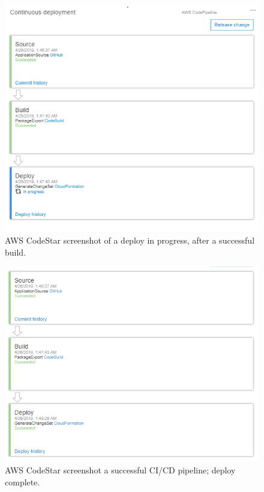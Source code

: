 \documentclass[10pt, a4paper]{article}
\begin{document}
\begin{figure}[H]
\begin{center}
  \includegraphics[scale=.7]{deploy-in-progress.PNG}
  \caption{AWS CodeStar screenshot of a deploy in progress, after a successful build.}
\end{center}
\end{figure}

\begin{figure}[H]
\begin{center}
  \includegraphics[scale=.7]{successful-deploy.PNG}
  \caption{AWS CodeStar screenshot a successful CI/CD pipeline; deploy complete.}
\end{center}
\end{figure}
\end{document}
